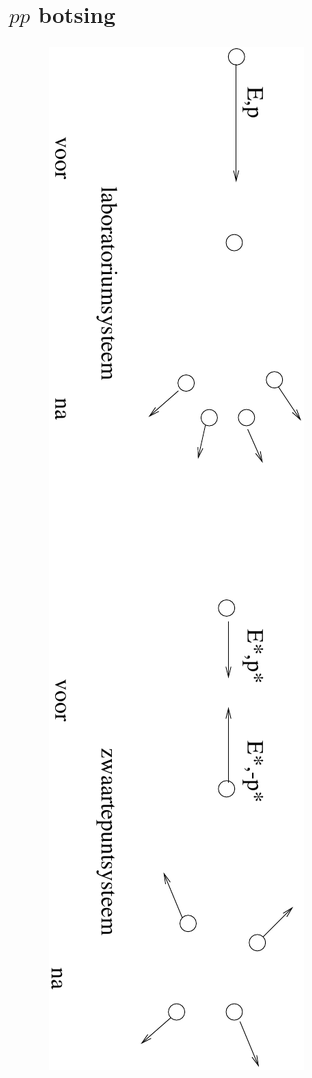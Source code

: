 \subsection{$pp$ botsing}


\begin{figure}[ht]
\centering
\includegraphics[width=.8\textwidth]{oefeningen.pictures/ppbotsing}

\end{figure}
